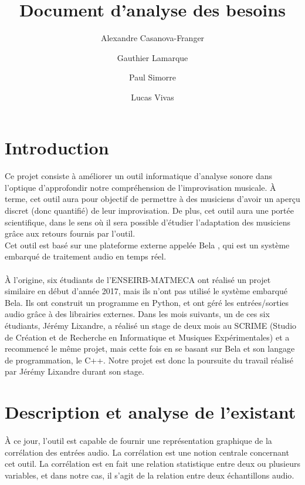 \documentclass{article}
\title{Document d'analyse des besoins}
\author{Alexandre Casanova-Franger\\
        \and
        Gauthier Lamarque\\
        \and
        Paul Simorre\\
        \and
        Lucas Vivas\\}
\begin{document}
\maketitle
\section{Introduction}
\paragraph{}
Ce projet consiste à améliorer un outil informatique d'analyse sonore dans
l'optique d'approfondir notre compréhension de l'improvisation musicale. À
terme, cet outil aura pour objectif de permettre à des musiciens d'avoir un
aperçu discret (donc quantifié) de leur improvisation. De plus, cet outil aura
une portée scientifique, dans le sens où il sera possible d'étudier l'adaptation
des musiciens grâce aux retours fournis par l'outil. \\
Cet outil est basé sur une plateforme externe appelée Bela \cite{BELA},
qui est un système embarqué de traitement audio en temps réel.
\paragraph{}
À l'origine, six étudiants de l'ENSEIRB-MATMECA ont réalisé un projet similaire
en début d'année 2017, mais ils n'ont pas utilisé le système embarqué Bela. Ils
ont construit un programme en Python, et ont géré les entrées/sorties audio
grâce à des librairies externes. Dans les mois suivants, un de ces six
étudiants, Jérémy Lixandre, a réalisé un stage de deux mois au SCRIME (Studio
de Création et de Recherche en Informatique et Musiques Expérimentales) et a
recommencé le même projet, mais cette fois en se basant sur Bela et son langage
de programmation, le C++. Notre projet est donc la poursuite du travail réalisé
par Jérémy Lixandre durant son stage\cite{JLR}.
\section{Description et analyse de l'existant}
\paragraph{}
À ce jour, l'outil est capable de fournir une représentation graphique de la
corrélation des entrées audio. La corrélation est une notion centrale
concernant cet outil. La corrélation est en fait une relation statistique
entre deux ou plusieurs variables, et dans notre cas, il s'agit de la
relation entre deux échantillons audio\cite{CPR}.
\end{document}
